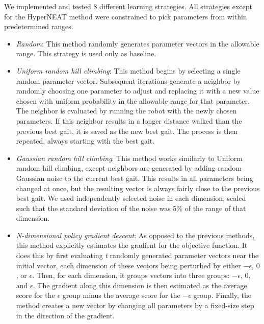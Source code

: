 We implemented and tested 8 different learning strategies.  All
strategies except for the HyperNEAT method\cite{clune} were
constrained to pick parameters from within predetermined ranges.

\begin{itemize}

\item \emph{Random}: This method randomly generates parameter vectors
  in the allowable range. This strategy is used only as baseline.

\item \emph{Uniform random hill climbing}: This method begins by
  selecting a single random parameter vector.  Subsequent iterations
  generate a neighbor by randomly choosing one parameter to adjust and
  replacing it with a new value chosen with uniform probability in the
  allowable range for that parameter. The neighbor is evaluated by
  running the robot with the newly chosen parameters. If this neighbor
  results in a longer distance walked than the previous best gait, it
  is saved as the new best gait. The process is then repeated, always
  starting with the best gait.

\item \emph{Gaussian random hill climbing}: This method works
  similarly to Uniform random hill climbing, except neighbors are
  generated by adding random Gaussian noise to the current best gait.
  This results in all parameters being changed at once, but the
  resulting vector is always fairly close to the previous best gait.
  We used independently selected noise in each dimension, scaled such
  that the standard deviation of the noise was 5\% of the range of
  that dimension.

\item \emph{N-dimensional policy gradient descent}: As opposed to the
  previous methods, this method explicitly estimates the gradient for
  the objective function. It does this by first evaluating \emph{t}
  randomly generated parameter vectors near the initial vector, each
  dimension of these vectors being perturbed by either $-\epsilon$,
  $0$, or $\epsilon$. Then, for each dimension, it groups vectors into
  three groups: $-\epsilon$, $0$, and $\epsilon$.  The gradient along
  this dimension is then estimated as the average score for the
  $\epsilon$ group minus the average score for the $-\epsilon$
  group. Finally, the method creates a new vector by changing all
  parameters by a fixed-size step in the direction of the gradient.


\end{itemize}
